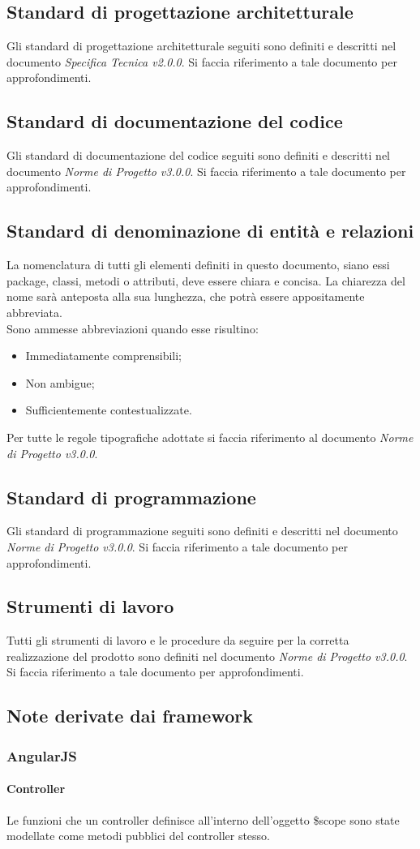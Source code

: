 \subsection{Standard di progettazione architetturale}
Gli standard di progettazione architetturale seguiti sono definiti e descritti nel documento \textit{Specifica Tecnica v2.0.0}. Si faccia riferimento a tale
documento per approfondimenti.

\subsection{Standard di documentazione del codice}
Gli standard di documentazione del codice seguiti sono definiti e descritti nel documento \textit{Norme di Progetto v3.0.0}. Si faccia riferimento a tale
documento per approfondimenti.

\subsection{Standard di denominazione di entità e relazioni}
La nomenclatura di tutti gli elementi definiti in questo documento, siano essi package, classi, metodi o attributi, deve essere chiara e concisa. 
La chiarezza del nome sarà anteposta alla sua lunghezza, che potrà essere appositamente abbreviata. \\
\noindent Sono ammesse abbreviazioni quando esse risultino:
\begin{itemize}
	 \item Immediatamente comprensibili;
	 \item Non ambigue;
	 \item Sufficientemente contestualizzate.
\end{itemize}
Per tutte le regole tipografiche adottate si faccia riferimento al documento \textit{Norme di Progetto v3.0.0}.

\subsection{Standard di programmazione}
Gli standard di programmazione seguiti sono definiti e descritti nel documento \textit{Norme di Progetto v3.0.0}. Si faccia riferimento a tale
documento per approfondimenti.

\subsection{Strumenti di lavoro}
Tutti gli strumenti di lavoro e le procedure da seguire per la corretta realizzazione del prodotto sono definiti nel documento \textit{Norme di Progetto v3.0.0}.
Si faccia riferimento a tale documento per approfondimenti.

\subsection{Note derivate dai framework}
	\subsubsection{AngularJS}
		\paragraph{Controller}
		Le funzioni che un controller definisce all'interno dell'oggetto \$scope sono state modellate come metodi pubblici del controller stesso.